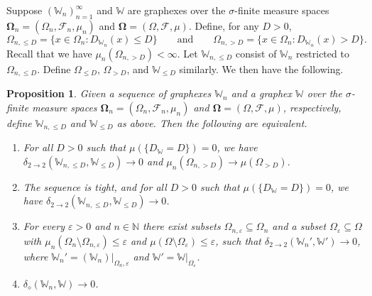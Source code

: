 \documentclass{amsart}
\numberwithin{equation}{section}
\numberwithin{figure}{section}
\newtheorem{proposition}[theorem]{Proposition}
\theoremstyle{definition}
\theoremstyle{remark}
\newcommand{\eps}{\varepsilon}
\newcommand{\bOmega}{{\mathbf{\Omega}}}
\newcommand{\NN}{\mathbb{N}}
\newcommand{\cW}{\mathbb{W}}
\newcommand{\cF}{\mathcal{F}}
\newcommand{\deltt}{\delta_{2\to 2}}
\def\delGP{\delta_\diamond}
\begin{document}
Suppose $(\cW_n)_{n=1}^\infty$ and $\cW$ are graphexes over the
$\sigma$-finite measure spaces $\bOmega_n=(\Omega_n,\cF_n,\mu_n)$ and
$\bOmega=(\Omega,\cF,\mu)$. Define, for any $D>0$,
\[
\Omega_{n,\leq D}=\{x \in \Omega_n: D_{\cW_n}(x) \le D\}
\qquad\text{and}\qquad
\Omega_{n,>D}=\{x \in \Omega_n: D_{\cW_n}(x) > D\}.
\]
Recall that we have $\mu_n(\Omega_{n, >D})<\infty$. Let $\cW_{n,\leq D}$
consist of $\cW_n$ restricted to $\Omega_{n,{\leq D}}$. Define $\Omega_{\leq
D}$, $\Omega_{>D}$, and $\cW_{\leq D}$ similarly. We then have the following.
\begin{proposition} \label{propgeneralconvergenceequiv}
Given a sequence of graphexes $\cW_n$ and a graphex $\cW$ over the
$\sigma$-finite measure spaces $\bOmega_n=(\Omega_n,\cF_n,\mu_n)$ and
$\bOmega=(\Omega,\cF,\mu)$, respectively, define $\cW_{n,{\leq D}}$ and
$\cW_{\leq D}$ as above. Then the following are equivalent.
\begin{enumerate}
\item\label{convequivatmostDboth} For all $D>0$ such that
    $\mu(\{D_{\cW}=D\})=0$, we have $\deltt(\cW_{n,{\leq D}},\cW_{\leq D})
\rightarrow 0$ and $\mu_n(\Omega_{n,>D}) \rightarrow \mu(\Omega_{>D})$.
\item\label{convequivatmostDtight} The sequence is tight, and for all $D>0$
    such that $\mu(\{D_{\cW}=D\})=0$, we have $\deltt(\cW_{n,{\leq
D}},\cW_{\leq D}) \rightarrow 0$.
\item \label{convequivremoveeps} For every $\varepsilon>0$ and $n\in\NN$
    there exist subsets $\Omega_{n,\varepsilon} \subseteq \Omega_n$ and a
subset $\Omega_{\varepsilon} \subseteq\Omega$ with $\mu_{n}(\Omega_n
\setminus \Omega_{n,\varepsilon}) \le\varepsilon$ and $\mu(\Omega \setminus
\Omega_{\varepsilon}) \le \varepsilon$, such that $\deltt(\cW_n',\cW')
\rightarrow 0$, where $\cW_n'=(\cW_n)|_{\Omega_n,\eps}$ and
$\cW'=\cW|_{\Omega_\eps}$.
\item\label{convequivepsilondistance} $\delGP(\cW_n,\cW) \rightarrow 0$.
\end{enumerate}
\end{proposition}
\end{document}
